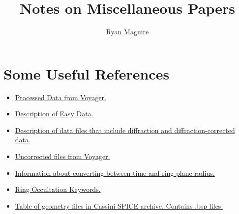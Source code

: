 \documentclass{article}
\begin{document}
    \title{Notes on Miscellaneous Papers}
    \author{Ryan Maguire}
    \date{\vspace{-5ex}}
    \maketitle
    \tableofcontents
    \listoffigures
    \listoftables
    \clearpage
    \section{Some Useful References}
        \begin{itemize}[itemsep=0pt]
            \item \href{https://pds-rings.seti.org/voyager/rss/index.html}
                       {Processed Data from Voyager.}
            \item \href{https://pds-rings.seti.org/volumes/VG_28xx_peer_review/%
                        VG_2803/S_RINGS/EASYDATA/DATAINFO.TXT}
                       {Description of Easy Data.}
            \item \href{https://pds-rings.seti.org/volumes/VG_28xx_peer_review/%
                        VG_2803/S_RINGS/EDITDATA/DATAINFO.TXT}
                       {Description of data files that include diffraction and
                        diffraction-corrected data.}
            \item \href{https://pds-rings.seti.org/volumes/VG_28xx_peer_review/%
                        VG_2803/S_RINGS/EDITDATA/RS1D1XUI.LBL}
                       {Uncorrected files from Voyager.}
            \item \href{https://pds-rings.seti.org/volumes/%
                        VG_28xx_peer_review/VG_2803/S_RINGS/%
                        GEOMETRY/GEOMINFO.TXT}
                       {Information about converting between
                        time and ring plane radius.}
            \item \href{https://pds-rings.seti.org/holdings/%
                        volumes/COVIMS_8xxx_lien_resolution/%
                        COVIMS_8001/DOCUMENT/%
                        Occultation_Keywords.pdf}
                       {Ring Occultation Keywords.}
            \item \href{https://naif.jpl.nasa.gov/pub/%
                        naif/pds/data/co-s_j_e_v-spice-6-v1.0/%
                        cosp_1000/data/pck/pckinfo.txt}
                       {Table of geometry files in Cassini
                        SPICE archive. Contains .bsp files.}
        \end{itemize}
\end{document}
